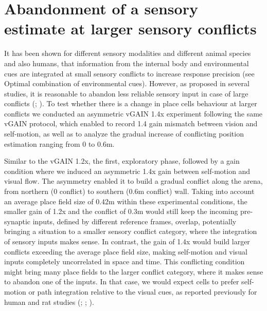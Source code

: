\section{Abandonment of a sensory estimate at larger sensory conflicts}
\label{sec:gain_12}

It has been shown for different sensory modalities and different animal species and also humans, that information from the internal body and environmental cues are integrated at small sensory conflicts to increase response precision (see Optimal combination of environmental cues). However, as proposed in several studies, it is reasonable to abandon less reliable sensory input in case of large conflicts  (\cite{Sjolund2018}; \cite{Cheng2007}). To test whether there is a change in place cells behaviour at larger conflicts we conducted an asymmetric vGAIN 1.4x experiment following the same vGAIN protocol, which enabled to record 1.4 gain mismatch between vision and self-motion, as well as to analyze the gradual increase of conflicting position estimation ranging from 0 to 0.6m.

Similar to the vGAIN 1.2x, the first, exploratory phase, followed by a gain condition where we induced an asymmetric 1.4x gain between self-motion and visual flow. The asymmetry enabled it to build a gradual conflict along the arena, from northern (0 conflict) to southern (0.6m conflict) wall. Taking into account an average place field size of 0.42m within these experimental conditions, the smaller gain of 1.2x and the conflict of 0.3m would still keep the incoming pre-synaptic inputs, defined by different reference frames, overlap, potentially bringing a situation to a smaller sensory conflict category, where the integration of sensory inputs makes sense. In contrast, the gain of 1.4x would build larger conflicts exceeding the average place field size, making self-motion and visual inputs completely uncorrelated in space and time. This conflicting condition might bring many place fields to the larger conflict category, where it makes sense to abandon one of the inputs. In that case, we would expect cells to prefer self-motion or path integration relative to the visual cues, as reported previously for human and rat studies (\cite{Sjolund2018}; \cite{Zhao2015}; \cite{Shettleworth2005}).

